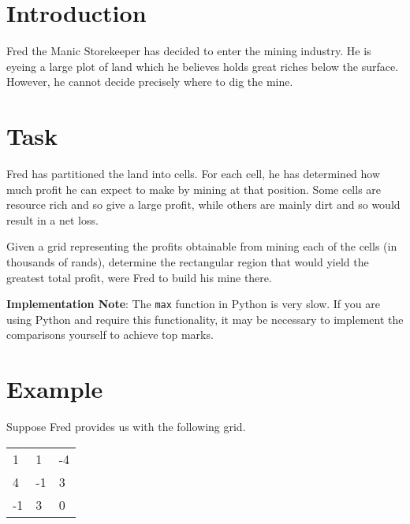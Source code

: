 \documentclass{saco}
\begin{document}
\maketitle

\section{Introduction}

Fred the Manic Storekeeper has decided to enter the mining industry. He is eyeing a large plot of land which he believes holds great riches below the surface.
However, he cannot decide precisely where to dig the mine.

\section{Task}

Fred has partitioned the land into cells. For each cell, he has determined how much profit he can expect to make by mining at that position.
Some cells are resource rich and so give a large profit, while others are mainly dirt and so would result in a net loss.

Given a grid representing the profits obtainable from mining each of the cells (in thousands of rands), determine the rectangular region that would
yield the greatest total profit, were Fred to build his mine there.

\textbf{Implementation Note}: The \texttt{max} function in Python is very slow. If you are using Python and require this functionality, it may be necessary to implement the comparisons yourself to achieve top marks.

\section{Example}

Suppose Fred provides us with the following grid.
\begin{table}[h!bt]
\begin{center}
\begin{tabular}{lll}
 1 & 1 & -4 \\
 4 & -1 & 3 \\
 -1 & 3 & 0
\end{tabular}
\end{center}
\end{table}
\end{document}
